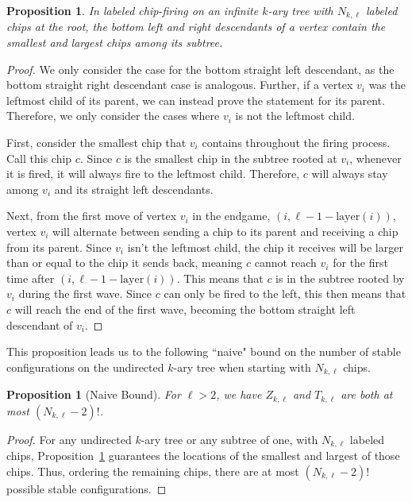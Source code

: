 \documentclass[11pt]{article}
\newtheorem{prop}[theorem]{Proposition}
\theoremstyle{remark}
\theoremstyle{definition}
\begin{document}
\begin{prop}\label{prop:smallestchip}
In labeled chip-firing on an infinite $k$-ary tree with $N_{k, \ell}$ labeled chips at the root, the bottom left and right descendants of a vertex contain the smallest and largest chips among its subtree.
\end{prop}

\begin{proof}

We only consider the case for the bottom straight left descendant, as the bottom straight right descendant case is analogous. Further, if a vertex $v_i$ was the leftmost child of its parent, we can instead prove the statement for its parent. Therefore, we only consider the cases where $v_i$ is not the leftmost child.

First, consider the smallest chip that $v_i$ contains throughout the firing process. Call this chip $c$. Since $c$ is the smallest chip in the subtree rooted at $v_i$, whenever it is fired, it will always fire to the leftmost child. Therefore, $c$ will always stay among $v_i$ and its straight left descendants.

Next, from the first move of vertex $v_i$ in the endgame, $(i, \ell-1-\text{layer}(i))$, vertex $v_i$ will alternate between sending a chip to its parent and receiving a chip from its parent. Since $v_i$ isn't the leftmost child, the chip it receives will be larger than or equal to the chip it sends back, meaning $c$ cannot reach $v_i$ for the first time after $(i, \ell-1-\text{layer}(i))$. This means that $c$ is in the subtree rooted by $v_i$ during the first wave. Since $c$ can only be fired to the left, this then means that $c$ will reach the end of the first wave, becoming the bottom straight left descendant of $v_i$.
\end{proof}

This proposition leads us to the following ``naive" bound on the number of stable configurations on the undirected $k$-ary tree when starting with $N_{k, \ell}$ chips.
\begin{prop}[Naive Bound]\label{prop:Naive}
    For $\ell > 2$, we have $Z_{k, \ell}$ and $ T_{k, \ell}$ are both at most $ (N_{k, \ell}-2)!$.
\end{prop}
\begin{proof}
    For any undirected $k$-ary tree or any subtree of one, with $N_{k, \ell}$ labeled chips, Proposition~\ref{prop:smallestchip} guarantees the locations of the smallest and largest of those chips. Thus, ordering the remaining chips, there are at most $(N_{k, \ell}-2)!$ possible stable configurations.
\end{proof}
\end{document}
